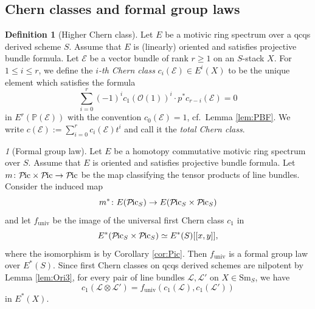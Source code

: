 \documentclass{amsart}
\theoremstyle{plain}
\theoremstyle{definition}
\newtheorem{definition}[theorem]{Definition}
\theoremstyle{remark}
\newtheorem{p}[theorem]{}
\numberwithin{equation}{theorem}
\newcommand{\mcal}[1]{\mathcal{#1}}
\newcommand{\mbb}[1]{\mathbb{#1}}
\newcommand{\Sm}{\mathrm{Sm}}
\newcommand{\univ}{\mathrm{univ}}
\newcommand{\Pic}{{\mathcal{P}\mspace{-2.0mu}\mathrm{ic}}}
\begin{document}
\subsection{Chern classes and formal group laws}\label{Che}

\begin{definition}[Higher Chern class]\label{def:Che}
Let $E$ be a motivic ring spectrum over a qcqs derived scheme $S$.
Assume that $E$ is (linearly) oriented and satisfies projective bundle formula.
Let $\mcal{E}$ be a vector bundle of rank $r\ge 1$ on an $S$-stack $X$.
For $1\le i\le r$, we define the \textit{$i$-th Chern class} $c_i(\mcal{E})\in E^i(X)$ to be the unique element which satisfies the formula
\[
	\sum_{i=0}^r (-1)^i c_1(\mcal{O}(1))^i \cdot p^*c_{r-i}(\mcal{E}) = 0
\]
in $E^r(\mbb{P}(\mcal{E}))$ with the convention $c_0(\mcal{E})=1$, cf.\ Lemma \ref{lem:PBF}.
We write $c(\mcal{E}):=\sum_{i=0}^rc_i(\mcal{E})t^i$ and call it the \textit{total Chern class}.
\end{definition}

\begin{p}[Formal group law]
Let $E$ be a homotopy commutative motivic ring spectrum over $S$.
Assume that $E$ is oriented and satisfies projective bundle formula.
Let $m\colon\Pic\times\Pic\to\Pic$ be the map classifying the tensor products of line bundles.
Consider the induced map
\[
	m^* \colon E(\Pic_S) \to E(\Pic_S\times\Pic_S)
\]
and let $f_\univ$ be the image of the universal first Chern class $c_1$ in
\[
	E^*(\Pic_S\times\Pic_S) \simeq E^*(S)[[x,y]],
\] 
where the isomorphism is by Corollary \ref{cor:Pic}.
Then $f_\univ$ is a formal group law over $E^*(S)$.
Since first Chern classes on qcqs derived schemes are nilpotent by Lemma \ref{lem:Ori3}, for every pair of line bundles $\mcal{L},\mcal{L}'$ on $X\in\Sm_S$, we have
\[
	c_1(\mcal{L}\otimes\mcal{L}') = f_\univ(c_1(\mcal{L}),c_1(\mcal{L}'))
\]
in $E^*(X)$.
\end{p}
\end{document}
